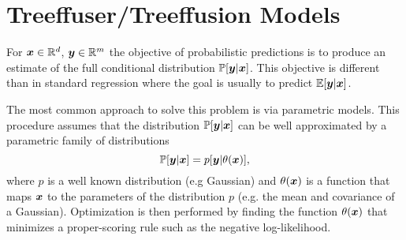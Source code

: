 \section{Treeffuser/Treeffusion Models}
\label{sec:treefusser}
For $\boldsymbol{x} \in \mathbb{R}^d$, $\boldsymbol{y} \in \mathbb{R}^m$ the objective of probabilistic
predictions is to produce an estimate of the full  conditional distribution $\mathbb{P}[\boldsymbol{y}|\boldsymbol{x}]$.
This objective is different than in standard regression where the goal
is usually to predict $\mathbb{E}[\boldsymbol{y}|\boldsymbol{x}]$.

The most common approach to solve this problem is via parametric models.
This procedure assumes that the distribution $\mathbb{P}[\boldsymbol{y}| \boldsymbol{x}]$
can be well approximated by a parametric family of distributions
\[ \mathbb{P}[\boldsymbol{y}| \boldsymbol{x}] = p[\boldsymbol{y}| \theta{(\boldsymbol{x})}], \]
where $p$ is a well known distribution (e.g Gaussian) and $\theta(\boldsymbol{x})$ is a function
that maps $\boldsymbol{x}$ to the parameters of the distribution $p$ (e.g. the mean and covariance of a Gaussian).
Optimization is then performed by finding the function $\theta(\boldsymbol{x})$ that minimizes
a proper-scoring rule such as the negative log-likelihood.
